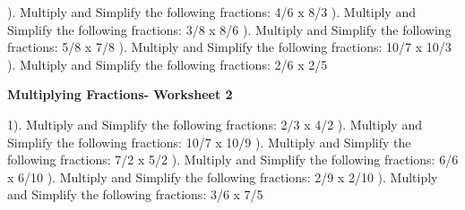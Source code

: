 \documentclass{article}%
\begin{document}
\newline%
). Multiply and Simplify the following fractions: 4/6 x 8/3%
\newline%
\newline%
). Multiply and Simplify the following fractions: 3/8 x 8/6%
\newline%
\newline%
). Multiply and Simplify the following fractions: 5/8 x 7/8%
\newline%
\newline%
). Multiply and Simplify the following fractions: 10/7 x 10/3%
\newline%
\newline%
). Multiply and Simplify the following fractions: 2/6 x 2/5%
\newline%
\newline%
\newline%
\pagebreak%
\large%
\begin{center}%
\textbf{Multiplying Fractions- Worksheet 2}%
\newline%
\end{center} \normalsize%
1). Multiply and Simplify the following fractions: 2/3 x 4/2%
\newline%
\newline%
). Multiply and Simplify the following fractions: 10/7 x 10/9%
\newline%
\newline%
). Multiply and Simplify the following fractions: 7/2 x 5/2%
\newline%
\newline%
). Multiply and Simplify the following fractions: 6/6 x 6/10%
\newline%
\newline%
). Multiply and Simplify the following fractions: 2/9 x 2/10%
\newline%
\newline%
). Multiply and Simplify the following fractions: 3/6 x 7/5%
\newline%
\newline%
\end{document}
